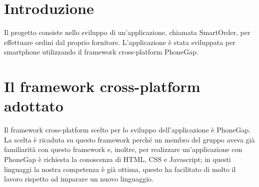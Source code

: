 \documentclass[12pt, a4paper, titlepage]{report}
\begin{document}
	
	\begin{frontespizio}
		\begin{Preambolo*}
			\usepackage{fourier}
		\end{Preambolo*}
	\end{frontespizio}
	
	\setcounter{page}{2}
	\tableofcontents
	\newpage
	\listoffigures
	\newpage	    
	\renewcommand*{\arraystretch}{2}
	\pagestyle{fancy}
	\fancyhf{}
	\cfoot{\thepage}
	
	\section{Introduzione}
	Il progetto consiste nello sviluppo di un'applicazione, chiamata SmartOrder, per effettuare ordini dal proprio fornitore. L'applicazione è stata sviluppata per smartphone utilizzando il framework cross-platform PhoneGap.
	
	\section{Il framework cross-platform adottato}
	Il framework cross-platform scelto per lo sviluppo dell'applicazione è PhoneGap. La scelta è ricaduta su questo framework perché un membro del gruppo aveva già familiarità con questo framework e, inoltre, per realizzare un'applicazione con PhoneGap è richiesta la conoscenza di HTML, CSS e Javascript; in questi linguaggi la nostra competenza è già ottima, questo ha facilitato di molto il lavoro rispetto ad imparare un nuovo linguaggio.
	
\end{document}
